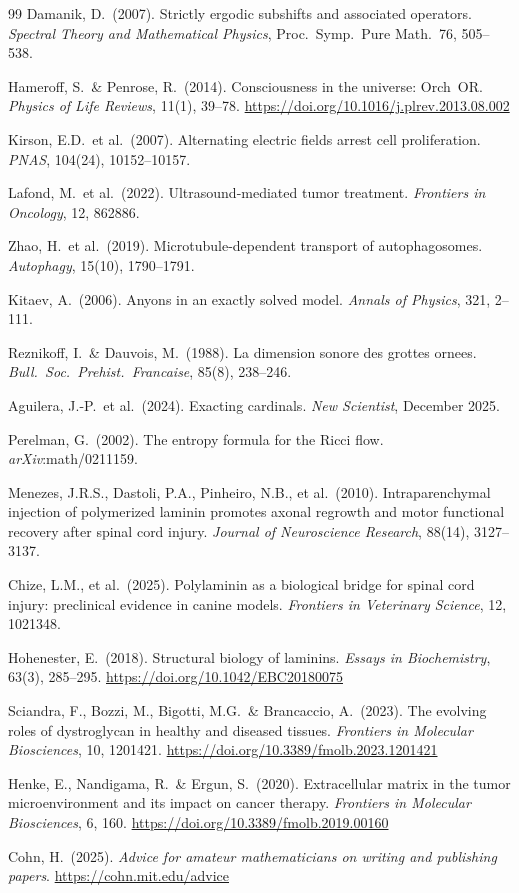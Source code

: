 \documentclass[12pt,a4paper]{article}
\begin{document}
\begin{thebibliography}{99}
Damanik, D.\ (2007).
Strictly ergodic subshifts and associated operators.
\textit{Spectral Theory and Mathematical Physics},
Proc.\ Symp.\ Pure Math.\ 76, 505--538.

Hameroff, S.\ \& Penrose, R.\ (2014).
Consciousness in the universe: Orch~OR.
\textit{Physics of Life Reviews}, 11(1), 39--78.
\url{https://doi.org/10.1016/j.plrev.2013.08.002}

Kirson, E.D.\ et al.\ (2007).
Alternating electric fields arrest cell proliferation.
\textit{PNAS}, 104(24), 10152--10157.

Lafond, M.\ et al.\ (2022).
Ultrasound-mediated tumor treatment.
\textit{Frontiers in Oncology}, 12, 862886.

Zhao, H.\ et al.\ (2019).
Microtubule-dependent transport of autophagosomes.
\textit{Autophagy}, 15(10), 1790--1791.

Kitaev, A.\ (2006).
Anyons in an exactly solved model.
\textit{Annals of Physics}, 321, 2--111.

Reznikoff, I.\ \& Dauvois, M.\ (1988).
La dimension sonore des grottes ornees.
\textit{Bull.\ Soc.\ Prehist.\ Francaise}, 85(8), 238--246.

Aguilera, J.-P.\ et al.\ (2024).
Exacting cardinals.
\textit{New Scientist}, December 2025.

Perelman, G.\ (2002).
The entropy formula for the Ricci flow.
\textit{arXiv}:math/0211159.

Menezes, J.R.S., Dastoli, P.A., Pinheiro, N.B., et al.\ (2010).
Intraparenchymal injection of polymerized laminin promotes
axonal regrowth and motor functional recovery after spinal cord injury.
\textit{Journal of Neuroscience Research}, 88(14), 3127--3137.

Chize, L.M., et al.\ (2025).
Polylaminin as a biological bridge for spinal cord injury:
preclinical evidence in canine models.
\textit{Frontiers in Veterinary Science}, 12, 1021348.

Hohenester, E.\ (2018).
Structural biology of laminins.
\textit{Essays in Biochemistry}, 63(3), 285--295.
\url{https://doi.org/10.1042/EBC20180075}

Sciandra, F., Bozzi, M., Bigotti, M.G.\ \& Brancaccio, A.\ (2023).
The evolving roles of dystroglycan in healthy and diseased tissues.
\textit{Frontiers in Molecular Biosciences}, 10, 1201421.
\url{https://doi.org/10.3389/fmolb.2023.1201421}

Henke, E., Nandigama, R.\ \& Ergun, S.\ (2020).
Extracellular matrix in the tumor microenvironment
and its impact on cancer therapy.
\textit{Frontiers in Molecular Biosciences}, 6, 160.
\url{https://doi.org/10.3389/fmolb.2019.00160}

Cohn, H.\ (2025).
\textit{Advice for amateur mathematicians on writing
and publishing papers}.
\url{https://cohn.mit.edu/advice}

\end{thebibliography}
\end{document}
